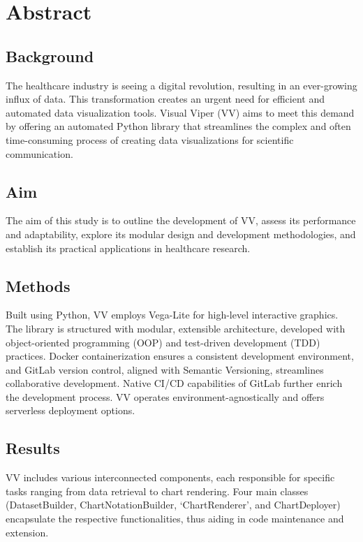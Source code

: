 \section{Abstract}\label{abstract}

\subsection*{Background}\label{background}

The healthcare industry is seeing a digital revolution, resulting in an
ever-growing influx of data. This transformation creates an urgent need
for efficient and automated data visualization tools. Visual Viper (VV)
aims to meet this demand by offering an automated Python library that
streamlines the complex and often time-consuming process of creating
data visualizations for scientific communication.

\subsection*{Aim}\label{aim}

The aim of this study is to outline the development of VV, assess its
performance and adaptability, explore its modular design and development
methodologies, and establish its practical applications in healthcare
research.

\subsection*{Methods}\label{methods}

Built using Python, VV employs Vega-Lite for high-level interactive
graphics. The library is structured with modular, extensible
architecture, developed with object-oriented programming (OOP) and
test-driven development (TDD) practices. Docker containerization ensures
a consistent development environment, and GitLab version control,
aligned with Semantic Versioning, streamlines collaborative development.
Native CI/CD capabilities of GitLab further enrich the development
process. VV operates environment-agnostically and offers serverless
deployment options.

\subsection*{Results}\label{results}

VV includes various interconnected components, each responsible for
specific tasks ranging from data retrieval to chart rendering. Four main
classes (\textquotesingle DatasetBuilder\textquotesingle,
\textquotesingle ChartNotationBuilder\textquotesingle, `ChartRenderer',
and \textquotesingle ChartDeployer\textquotesingle) encapsulate the
respective functionalities, thus aiding in code maintenance and
extension.

